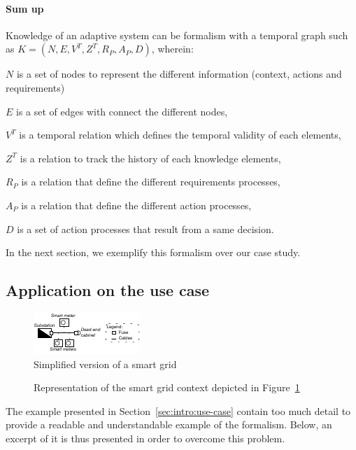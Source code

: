 \paragraph{Sum up}
Knowledge of an adaptive system can be formalism with a temporal graph such as $K = (N, E, V^T, Z^T, R_P, A_P, D)$, wherein:
\begin{condItemize}
	\item $N$ is a set of nodes to represent the different information (context, actions and requirements)
	\item $E$ is a set of edges with connect the different nodes,
	\item $V^T$ is a temporal relation which defines the temporal validity of each elements,
	\item $Z^T$ is a relation to track the history of each knowledge elements,
	\item $R_P$ is a relation that define the different requirements processes,
	\item $A_P$ is a relation that define the different action processes,
	\item $D$ is a set of action processes that result from a same decision.
\end{condItemize}

In the next section, we exemplify this formalism over our case study.


\subsection{Application on the use case}
\begin{figure}
	\centering
	\includegraphics[width=0.5\linewidth]{img/chapt-tkm/formalism/excerptSG}
	\caption{Simplified version of a smart grid}
	\label{fig:tkm:excerptSG}
\end{figure}

\begin{figure}
	\caption{Representation of the smart grid context depicted in Figure~\ref{fig:tkm:excerptSG}}
	\label{fig:tkm:contextFormExample}
\end{figure}


The example presented in Section~\ref{sec:intro:use-case} contain too much detail to provide a readable and understandable example of the formalism.
Below, an excerpt of it is thus presented in order to overcome this problem.


